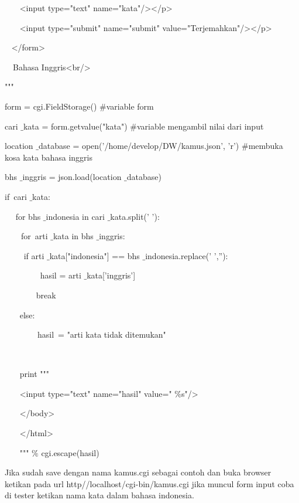 ~~~ <input type="text" name="kata"/></p> \par
\noindent 
~~~ <input type="submit" name="submit" value="Terjemahkan"/></p> \par
\noindent 
~ </form> \par
\noindent 
~~Bahasa Inggris<br/>   \par
\noindent 
""" \par
\vspace{12pt}
\noindent 
form = cgi.FieldStorage()  $  \#  $variable form \par
\noindent 
cari $  \_  $kata = form.getvalue("kata")  $  \#  $variable mengambil nilai dari input \par
\vspace{12pt}
\noindent 
location $  \_  $database = open('/home/develop/DW/kamus.json', 'r')  $  \#  $membuka kosa kata bahasa inggris \par
\noindent 
bhs $  \_  $inggris = json.load(location $  \_  $database) \par
\vspace{12pt}
\noindent 
if~cari $  \_  $kata:~   \par
\noindent 
~~ for bhs $  \_  $indonesia in cari $  \_  $kata.split(' '):  \par
\noindent 
~~~~for~arti $  \_  $kata in bhs $  \_  $inggris:    \par
\noindent 
~~~~ if arti $  \_  $kata["indonesia"] == bhs $  \_  $indonesia.replace(' ',''): \par
\noindent 
~~~~~~~~ hasil = arti $  \_  $kata['inggris']  \par
\noindent 
~~~~~~~ break \par
\noindent 
~~~ else: \par
\noindent 
~~~~~~~~hasil~= "arti kata tidak ditemukan"    \par
\noindent 
~~~~~~~~~~~~~~  \par
\noindent 
~~~ print """ \par
\noindent 
~~~ <input type="text" name="hasil" value=" $  \%  $s"/> \par
\noindent 
~~~ </body> \par
\noindent 
~~~ </html> \par
\noindent 
~~~ """  $  \%  $ cgi.escape(hasil) \par
\vspace{12pt}
Jika sudah save dengan nama kamus.cgi sebagai contoh dan buka browser ketikan pada url http//localhost/cgi-bin/kamus.cgi jika muncul form input coba di tester ketikan nama kata dalam bahasa indonesia. \par